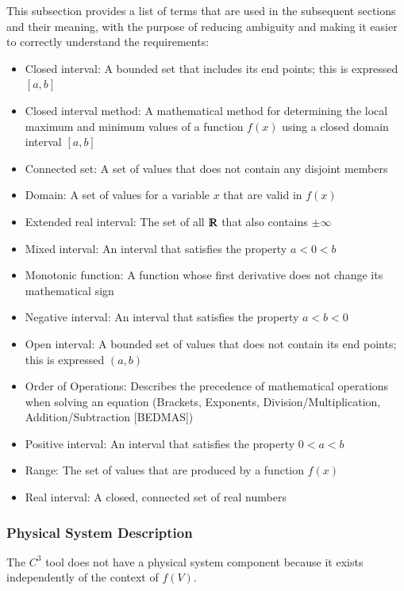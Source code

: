 \documentclass[12pt]{article}
\newcommand{\prognameAbbrv}{$C^{3}$}
\begin{document}
This subsection provides a list of terms that are used in the subsequent
sections and their meaning, with the purpose of reducing ambiguity and making it
easier to correctly understand the requirements:

\begin{itemize}

\item Closed interval: A bounded set that includes its end points; this is 
expressed $[a,b]$
\item Closed interval method: A mathematical method for determining the local 
maximum and minimum values of a function $f(x)$ using a closed domain interval 
$[a,b]$
\item Connected set: A set of values that does not contain any disjoint members
\item Domain: A set of values for a variable $x$ that are valid in $f(x)$
\item Extended real interval: The set of all $\varmathbb{R}$ that also contains 
$\pm \infty$
\item Mixed interval: An interval that satisfies the property $a < 0 < b$
\item Monotonic function: A function whose first derivative does not change its 
mathematical sign
\item Negative interval: An interval that satisfies the property $a < b < 0$
\item Open interval: A bounded set of values that does not contain its end 
points; this is expressed $(a,b)$
\item Order of Operations: Describes the precedence of mathematical operations 
when solving an equation (Brackets, Exponents, Division/Multiplication, 
Addition/Subtraction [BEDMAS])
\item Positive interval: An interval that satisfies the property $0 < a < b$
\item Range: The set of values that are produced by a function $f(x)$
\item Real interval: A closed, connected set of real numbers

\end{itemize}

\subsubsection{Physical System Description}

The \prognameAbbrv{} tool does not have a physical system component because it 
exists independently of the context of $f(V)$. 
\end{document}
